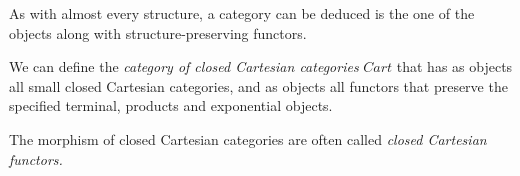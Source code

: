 As with almost every structure, a category can be deduced is the one of the objects along with structure-preserving functors.

\begin{definition}
  We can define the \emph{category of closed Cartesian categories} $Cart$ that has as objects all small closed Cartesian categories, and as objects all functors that preserve the specified terminal, products and exponential objects.
\end{definition}

The morphism of closed Cartesian categories are often called \emph{closed Cartesian functors.}

